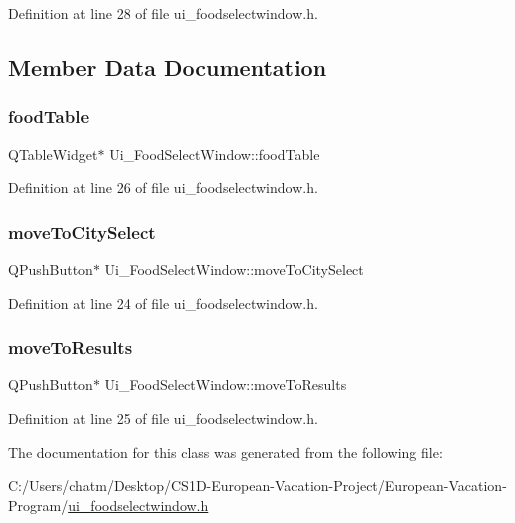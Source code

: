 Definition at line 28 of file ui\+\_\+foodselectwindow.\+h.



\subsection{Member Data Documentation}
\mbox{\label{class_ui___food_select_window_abddd1172ee154f7cb0635e1797d6c5f7}} 
\subsubsection{\texorpdfstring{foodTable}{foodTable}}
{\footnotesize\ttfamily Q\+Table\+Widget$\ast$ Ui\+\_\+\+Food\+Select\+Window\+::food\+Table}



Definition at line 26 of file ui\+\_\+foodselectwindow.\+h.

\mbox{\label{class_ui___food_select_window_a6d7e3e7bf1bc994438582bf3a7462952}} 
\subsubsection{\texorpdfstring{moveToCitySelect}{moveToCitySelect}}
{\footnotesize\ttfamily Q\+Push\+Button$\ast$ Ui\+\_\+\+Food\+Select\+Window\+::move\+To\+City\+Select}



Definition at line 24 of file ui\+\_\+foodselectwindow.\+h.

\mbox{\label{class_ui___food_select_window_aabf2f0f4d6761c9507f88e0033e87f95}} 
\subsubsection{\texorpdfstring{moveToResults}{moveToResults}}
{\footnotesize\ttfamily Q\+Push\+Button$\ast$ Ui\+\_\+\+Food\+Select\+Window\+::move\+To\+Results}



Definition at line 25 of file ui\+\_\+foodselectwindow.\+h.



The documentation for this class was generated from the following file\+:\begin{DoxyCompactItemize}
\item 
C\+:/\+Users/chatm/\+Desktop/\+C\+S1\+D-\/\+European-\/\+Vacation-\/\+Project/\+European-\/\+Vacation-\/\+Program/\mbox{\hyperlink{ui__foodselectwindow_8h}{ui\+\_\+foodselectwindow.\+h}}\end{DoxyCompactItemize}
